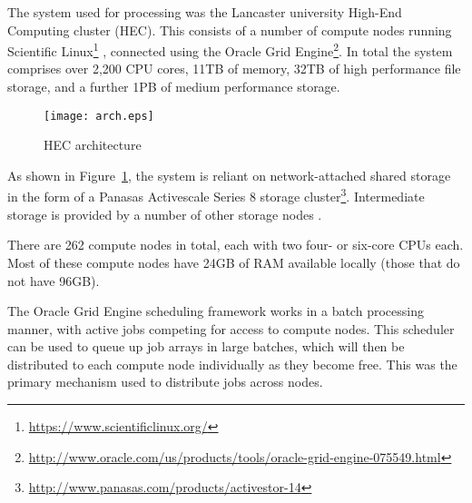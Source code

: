 The system used for processing was the Lancaster university High-End Computing cluster (HEC).  This consists of a number of compute nodes running Scientific Linux\footnote{\url{https://www.scientificlinux.org/}}%
, connected using the Oracle Grid Engine\footnote{\url{http://www.oracle.com/us/products/tools/oracle-grid-engine-075549.html}}.  
In total the system comprises over 2,200 CPU cores, 11TB of memory, 32TB of high performance file storage, and a further 1PB of medium performance storage.


\begin{figure}[h]
    \centering
    \texttt{[image: arch.eps]}
    \caption{HEC architecture}
    \label{fig:arch}
\end{figure}

As shown in Figure~\ref{fig:arch}, the system is reliant on network-attached shared storage in the form of a Panasas Activescale Series 8 storage cluster\footnote{\url{http://www.panasas.com/products/activestor-14}}\cite{Nagle2004PAS1048933.1049998}.  Intermediate storage is provided by a number of other storage nodes .

There are 262 compute nodes in total, each with two four- or six-core CPUs each.  Most of these compute nodes have 24GB of RAM available locally (those that do not have 96GB).

The Oracle Grid Engine scheduling framework works in a batch processing manner, with active jobs competing for access to compute nodes.  This scheduler can be used to queue up job arrays in large batches, which will then be distributed to each compute node individually as they become free.  This was the primary mechanism used to distribute jobs across nodes.

